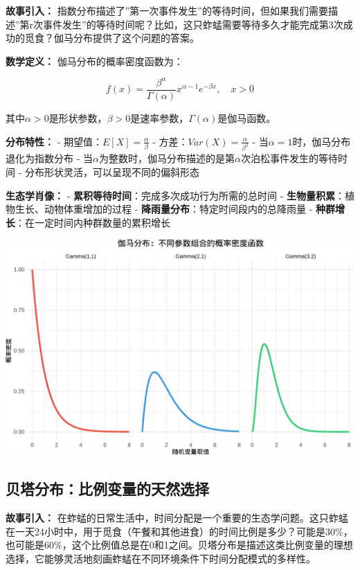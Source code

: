 \documentclass[
]{book}
\begin{document}
\textbf{故事引入：} 指数分布描述了''第一次事件发生''的等待时间，但如果我们需要描述''第r次事件发生''的等待时间呢？比如，这只蚱蜢需要等待多久才能完成第3次成功的觅食？伽马分布提供了这个问题的答案。

\textbf{数学定义：} 伽马分布的概率密度函数为：

\[f(x) = \frac{\beta^\alpha}{\Gamma(\alpha)} x^{\alpha-1} e^{-\beta x}, \quad x > 0\]

其中\(\alpha > 0\)是形状参数，\(\beta > 0\)是速率参数，\(\Gamma(\alpha)\)是伽马函数。

\textbf{分布特性：}
- 期望值：\(E[X] = \frac{\alpha}{\beta}\)
- 方差：\(Var(X) = \frac{\alpha}{\beta^2}\)
- 当\(\alpha = 1\)时，伽马分布退化为指数分布
- 当\(\alpha\)为整数时，伽马分布描述的是第\(\alpha\)次泊松事件发生的等待时间
- 分布形状灵活，可以呈现不同的偏斜形态

\textbf{生态学肖像：}
- \textbf{累积等待时间}：完成多次成功行为所需的总时间
- \textbf{生物量积累}：植物生长、动物体重增加的过程
- \textbf{降雨量分布}：特定时间段内的总降雨量
- \textbf{种群增长}：在一定时间内种群数量的累积增长

\begin{center}\includegraphics[width=0.8\linewidth]{ecological-statistics_files/figure-latex/unnamed-chunk-30-1} \end{center}

\hypertarget{ux8d1dux5854ux5206ux5e03ux6bd4ux4f8bux53d8ux91cfux7684ux5929ux7136ux9009ux62e9}{%
\subsection{贝塔分布：比例变量的天然选择}\label{ux8d1dux5854ux5206ux5e03ux6bd4ux4f8bux53d8ux91cfux7684ux5929ux7136ux9009ux62e9}}

\textbf{故事引入：} 在蚱蜢的日常生活中，时间分配是一个重要的生态学问题。这只蚱蜢在一天24小时中，用于觅食（午餐和其他进食）的时间比例是多少？可能是30\%，也可能是60\%，这个比例值总是在0和1之间。贝塔分布是描述这类比例变量的理想选择，它能够灵活地刻画蚱蜢在不同环境条件下时间分配模式的多样性。
\end{document}
